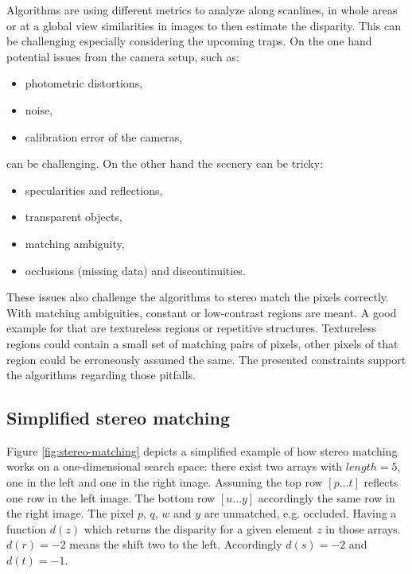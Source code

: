 Algorithms are using different metrics to analyze along scanlines, in whole areas or at a global view similarities in images to then estimate the disparity.
This can be challenging especially considering the upcoming traps.
On the one hand potential issues from the camera setup, such as:

\begin{itemize}
  \item photometric distortions,
  \item noise,
  \item calibration error of the cameras,
\end{itemize}

\noindent can be challenging. On the other hand the scenery can be tricky:

\begin{itemize}
  \item specularities and reflections,
  \item transparent objects,
  \item matching ambiguity,
  \item occlusions (missing data) and discontinuities.
\end{itemize}

\noindent These issues also challenge the algorithms to stereo match the pixels correctly.
With matching ambiguities, constant or low-contrast regions are meant.
A good example for that are textureless regions or repetitive structures.
Textureless regions could contain a small set of matching pairs of pixels, other pixels of that region could be erroneously assumed the same.
The presented constraints support the algorithms regarding those pitfalls.

\subsection*{Simplified stereo matching}

Figure \ref{fig:stereo-matching} depicts a simplified example of how stereo matching works on a one-dimensional search space:
there exist two arrays with $length = 5$, one in the left and one in the right image.
Assuming the top row $[p \dots t]$ reflects one row in the left image.
The bottom row $[u \dots y]$ accordingly the same row in the right image.
The pixel $p$, $q$, $w$ and $y$ are unmatched, e.g. occluded.
Having a function $d(z)$ which returns the disparity for a given element $z$ in those arrays.
$d(r) = -2$ means the shift two to the left.
Accordingly $d(s) = -2$ and $d(t) = -1$.

